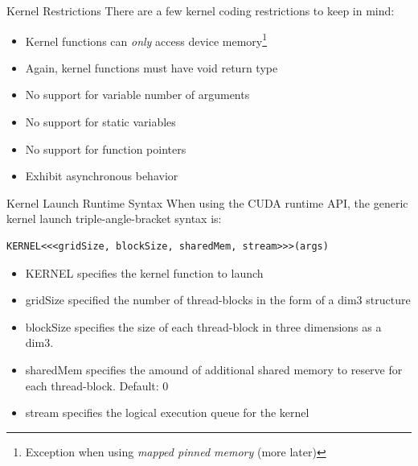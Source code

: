 \documentclass[handout]{beamer}
\begin{document}
\begin{frame}{Kernel Restrictions}
There are a few kernel coding restrictions to keep in mind:
\break
\begin{itemize}
\itemsep1em
	\item<1->Kernel functions can \emph{only} access device memory\footnote{Exception when using \emph{mapped pinned memory} (more later)\hfill\break}
	\item<1->Again, kernel functions must have {\selectfont void} return type
	\item<1->No support for variable number of arguments
	\item<1->No support for static variables
	\item<1->No support for function pointers
	\item<1->Exhibit asynchronous behavior
\end{itemize}
\end{frame}

\begin{frame}[fragile]{Kernel Launch Runtime Syntax}
When using the CUDA runtime API, the generic kernel launch triple-angle-bracket syntax is:
\hfill\break
\begin{lstlisting}[caption={Kernel launch syntax using runtime API}]
KERNEL<<<gridSize, blockSize, sharedMem, stream>>>(args)
\end{lstlisting}
\begin{itemize}
	\item<1->{\selectfont KERNEL} specifies the kernel function to launch
	\item<1->{\selectfont gridSize} specified the number of thread-blocks in the form of a {\selectfont dim3} structure
	\item<1->{\selectfont blockSize} specifies the size of each thread-block in three dimensions as a {\selectfont dim3}.
	\item<1->{\selectfont sharedMem} specifies the amound of additional shared memory to reserve for each thread-block. Default: 0
	\item<1->{\selectfont stream} specifies the logical execution queue for the kernel
\end{itemize}
\end{frame}
\end{document}
